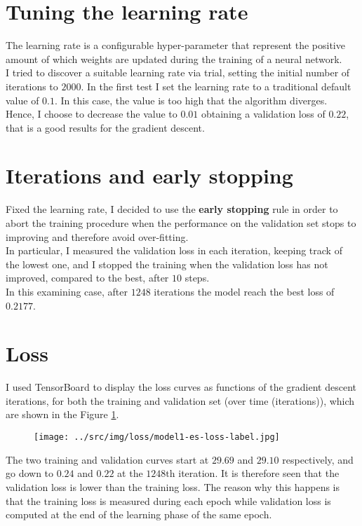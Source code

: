 \documentclass[a4paper,12pt]{article} %
\begin{document}
	\section{Tuning the learning rate}
	The learning rate is a configurable hyper-parameter that represent the positive amount of which weights are updated during the training of a neural network.\\
	I tried to discover a suitable learning rate via trial, setting the initial number of iterations to $2000$.
	In the first test I set the learning rate to a traditional default value of $0.1$. In this case, the value is too high that the algorithm diverges.\\
	Hence, I choose to decrease the value to $0.01$ obtaining a validation loss of $0.22$, that is a good results for the gradient descent.
	
	\section{Iterations and early stopping}
	Fixed the learning rate, I decided to use the \textbf{early stopping} rule in order to abort the training procedure when the performance on the validation set stops to improving and therefore avoid over-fitting. \\
	In particular, I measured the validation loss in each iteration, keeping track of the lowest one, and I stopped the training when the validation loss has not improved, compared to the best, after $10$ steps.\\
	In this examining case, after $1248$ iterations the model reach the best loss of $0.2177$.
	
	\section{Loss}
	
	I used {TensorBoard} to display the loss curves as functions of the gradient descent iterations, for both the training and validation set (over time (iterations)), which are shown in the Figure \ref{fig:model1-loss}.
	
	\begin{figure}[ht]
		\centering
		\texttt{[image: ../src/img/loss/model1-es-loss-label.jpg]}
		\label{fig:model1-loss}
	\end{figure}
	
	The two training and validation curves start at $29.69$ and $29.10$ respectively, and go down to $0.24$ and $0.22$ at the $1248\mathrm{th}$ iteration.
	It is therefore seen that the validation loss is lower than the training loss. The reason why this happens is that the training loss is measured during each epoch while validation loss is computed at the end of the learning phase of the same epoch.
	
\end{document}
